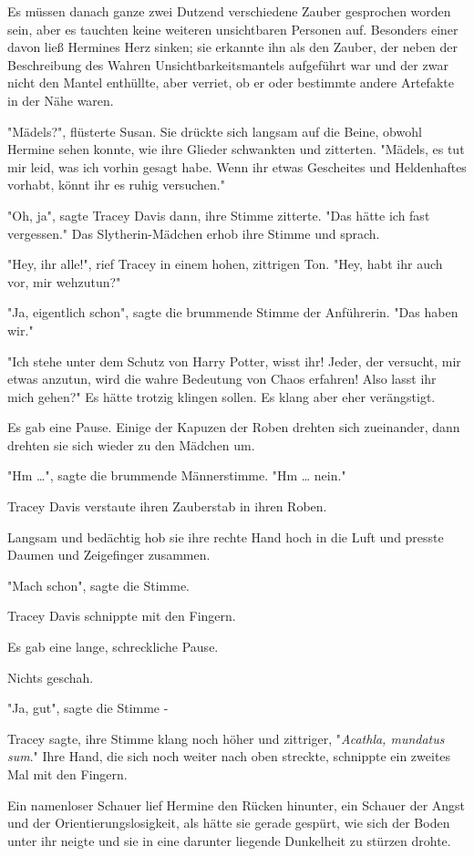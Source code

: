 {Es müssen danach ganze zwei Dutzend verschiedene Zauber gesprochen worden sein, aber es tauchten keine weiteren unsichtbaren Personen auf. Besonders einer davon ließ Hermines Herz sinken; sie erkannte ihn als den Zauber, der neben der Beschreibung des Wahren Unsichtbarkeitsmantels aufgeführt war und der zwar nicht den Mantel enthüllte, aber verriet, ob er oder bestimmte andere Artefakte in der Nähe waren.

"Mädels?", flüsterte Susan. Sie drückte sich langsam auf die Beine, obwohl Hermine sehen konnte, wie ihre Glieder schwankten und zitterten. "Mädels, es tut mir leid, was ich vorhin gesagt habe. Wenn ihr etwas Gescheites und Heldenhaftes vorhabt, könnt ihr es ruhig versuchen."

"Oh, ja", sagte Tracey Davis dann, ihre Stimme zitterte. "Das hätte ich fast vergessen." Das Slytherin-Mädchen erhob ihre Stimme und sprach.

"Hey, ihr alle!", rief Tracey in einem hohen, zittrigen Ton. "Hey, habt ihr auch vor, mir wehzutun?"

"Ja, eigentlich schon", sagte die brummende Stimme der Anführerin. "Das haben wir."

"Ich stehe unter dem Schutz von Harry Potter, wisst ihr! Jeder, der versucht, mir etwas anzutun, wird die wahre Bedeutung von Chaos erfahren! Also lasst ihr mich gehen?" Es hätte trotzig klingen sollen. Es klang aber eher verängstigt.

Es gab eine Pause. Einige der Kapuzen der Roben drehten sich zueinander, dann drehten sie sich wieder zu den Mädchen um.

"Hm …", sagte die brummende Männerstimme. "Hm … nein."

Tracey Davis verstaute ihren Zauberstab in ihren Roben.

Langsam und bedächtig hob sie ihre rechte Hand hoch in die Luft und presste Daumen und Zeigefinger zusammen.

"Mach schon", sagte die Stimme.

Tracey Davis schnippte mit den Fingern.

Es gab eine lange, schreckliche Pause.

Nichts geschah.

"Ja, gut", sagte die Stimme -

Tracey sagte, ihre Stimme klang noch höher und zittriger, "\emph{Acathla, mundatus sum}." Ihre Hand, die sich noch weiter nach oben streckte, schnippte ein zweites Mal mit den Fingern.

Ein namenloser Schauer lief Hermine den Rücken hinunter, ein Schauer der Angst und der Orientierungslosigkeit, als hätte sie gerade gespürt, wie sich der Boden unter ihr neigte und sie in eine darunter liegende Dunkelheit zu stürzen drohte.

}
